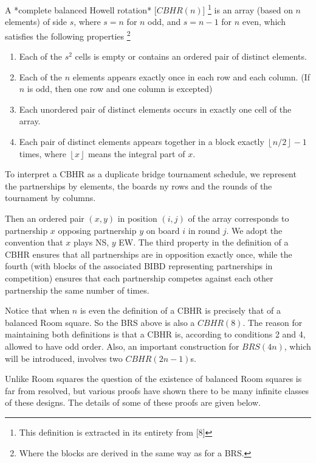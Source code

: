 \documentclass[
  11pt,
  a4paper]{book}\usepackage[]{graphicx}\usepackage[]{xcolor}
\begin{document}
A *complete balanced Howell rotation* [$CBHR(n)$]
\footnote{This definition is extracted in its entirety from [8]}
is an
array (based on $n$ elements) of side $s$, where $s = n$ for
$n$ odd, and $s = n-1$ for $n$ even, which satisfies the
following properties
\footnote{Where the blocks are derived in the same way as for a BRS.}

\begin{enumerate}
  \item{Each of the $s^2$ cells is empty or contains an ordered
    pair of distinct elements.}
  \item{Each of the $n$ elements appears exactly once in each
    row and each column. (If $n$ is odd, then one row and
    one column is excepted)}
  \item{Each unordered pair of distinct elements occurs in
    exactly one cell of the array.}
  \item{Each pair of distinct elements appears together in a
    block exactly $\left \lfloor{n/2}\right \rfloor -1$
    times, where $\left \lfloor{x}\right \rfloor$ means the
    integral part of $x$.}
\end{enumerate}

To interpret a CBHR as a duplicate bridge tournament
schedule, we represent the partnerships by elements, the
boards ny rows and the rounds of the tournament by columns.

Then an ordered pair $(x, y)$ in position $(i, j)$ of the
array corresponds to partnership $x$ opposing partnership
$y$ on board $i$ in round $j$. We adopt the convention that
$x$ plays NS, $y$ EW. The third property in the definition
of a CBHR ensures that all partnerships are in opposition
exactly once, while the fourth (with blocks of the
associated BIBD representing partnerships in competition)
ensures that each partnership competes against each other
partnership the same number of times.

Notice that when $n$ is even the definition of a CBHR is
precisely that of a balanced Room square. So the BRS above
is also a $CBHR(8)$. The reason for maintaining both
definitions is that a CBHR is, according to conditions 2 and
4, allowed to have odd order. Also, an important
construction for $BRS(4n)$, which will be introduced,
involves two $CBHR(2n - 1)$s.

Unlike Room squares the question of the existence of
balanced Room squares is far from resolved, but various
proofs have shown there to be many infinite classes of these
designs. The details of some of these proofs are given
below.
\end{document}
